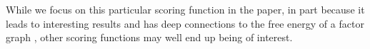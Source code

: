 \documentclass{article}
\newcommand{\V}{\mathcal V}
\newcommand{\dg}[1]{\mathbdcal #1}
\begin{document}
While we focus on this particular scoring function
in the paper, 
in part because
it leads to interesting results and has deep
connections to the free energy of a factor graph \cite{KF09},
other scoring functions may well end up being of interest. 
%		
%		
\end{document}
